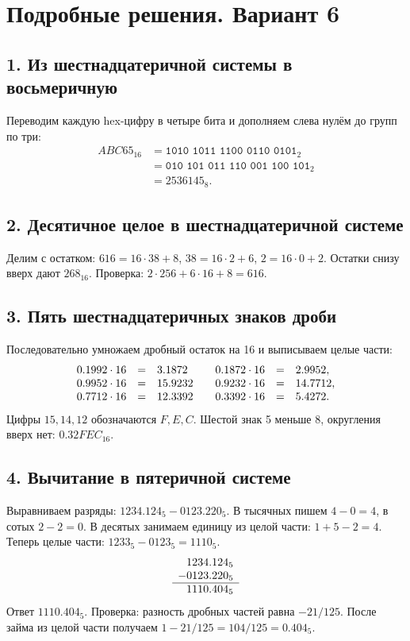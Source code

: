 \section*{Подробные решения. Вариант 6}

\subsection*{1. Из шестнадцатеричной системы в восьмеричную}
Переводим каждую hex-цифру в четыре бита и дополняем слева нулём до групп по три:
\[
\begin{aligned}
ABC65_{16}&=\texttt{1010 1011 1100 0110 0101}_2\\
&=\texttt{010 101 011 110 001 100 101}_2\\
&=\boxed{2536145_8}.
\end{aligned}
\]

\subsection*{2. Десятичное целое в шестнадцатеричной системе}
Делим с остатком: $616=16\cdot38+8$, $38=16\cdot2+6$, $2=16\cdot0+2$. Остатки снизу вверх дают $\boxed{268_{16}}$. Проверка: $2\cdot256+6\cdot16+8=616$.

\subsection*{3. Пять шестнадцатеричных знаков дроби}
Последовательно умножаем дробный остаток на 16 и выписываем целые части:
\[
\begin{array}{rcl@{\qquad}rcl}
0.1992\cdot16&=&3.1872&0.1872\cdot16&=&2.9952,\\
0.9952\cdot16&=&15.9232&0.9232\cdot16&=&14.7712,\\
0.7712\cdot16&=&12.3392&0.3392\cdot16&=&5.4272.
\end{array}
\]
Цифры $15,14,12$ обозначаются $F,E,C$. Шестой знак 5 меньше 8, округления вверх нет: $\boxed{0.32FEC_{16}}$.

\subsection*{4. Вычитание в пятеричной системе}
Выравниваем разряды: $1234.124_5-0123.220_5$. В тысячных пишем $4-0=4$, в сотых $2-2=0$. В десятых занимаем единицу из целой части: $1+5-2=4$. Теперь целые части: $1233_5-0123_5=1110_5$.
\[
\begin{array}{r@{}l}
1234&.124_5\\
-0123&.220_5\\\hline
1110&.404_5
\end{array}
\]
Ответ $\boxed{1110.404_5}$. Проверка: разность дробных частей равна $-21/125$. После займа из целой части получаем $1-21/125=104/125=0.404_5$.

